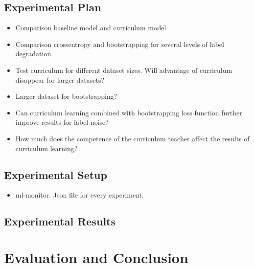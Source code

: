 \documentclass[a4paper]{book}
\begin{document}
\section{Experimental Plan}
\label{sec:experimentalPlan}
\begin{itemize}
\item Comparison baseline model and curriculum model
\item Comparison crossentropy and bootstrapping for several
levels of label degradation. 
\item Test curriculum for different dataset sizes. Will advantage of curriculum disappear for larger datasets?
\item Larger dataset for bootstrapping?
\item Can curriculum learning combined with bootstrapping loss function further improve results for label noise?
\item How much does the competence of the curriculum teacher affect the results of curriculum learning?
\end{itemize}

\section{Experimental Setup}
\label{sec:experimentalSetup}
\begin{itemize}
\item ml-monitor. Json file for every experiment.
\end{itemize}

\section{Experimental Results}
\label{sec:experimentalResults}


\chapter{Evaluation and Conclusion}
\label{cha:evaluationAndConclusion}
\end{document}

